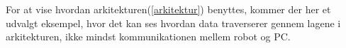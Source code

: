 
For at vise hvordan arkitekturen(\cref{arkitektur}) benyttes, kommer der her et udvalgt eksempel, hvor det kan ses hvordan data traverserer gennem lagene i arkitekturen, ikke mindst kommunikationen mellem robot og PC.

